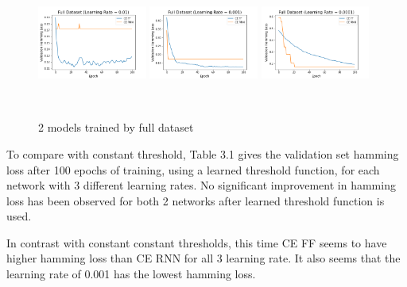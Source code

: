 \documentclass[11pt]{article}
\begin{document}
\begin{figure}[!htbp]
\centering 
        \includegraphics[width=0.32\textwidth,height=4.2cm]{Full_Dataset_Learning_Rate_01.png}
        \includegraphics[width=0.32\textwidth,height=4.2cm]{Full_Dataset_Learning_Rate_001.png}
        \includegraphics[width=0.32\textwidth,height=4.2cm]{Full_Dataset_Learning_Rate_0001.png}        
\caption[Original image and post processed image]{2 models trained by full dataset}
\label{fig:example1} 
\end{figure}

To compare with constant threshold, Table 3.1 gives the validation set hamming loss after 100 epochs of training, using a learned threshold function, for each network with 3 different learning rates. No significant improvement in hamming loss has been observed for both 2 networks after learned threshold function is used.

In contrast with constant constant thresholds, this time CE FF seems to have higher hamming loss than CE RNN for all 3 learning rate. It also seems that the learning rate of 0.001 has the lowest hamming loss.
\end{document}
